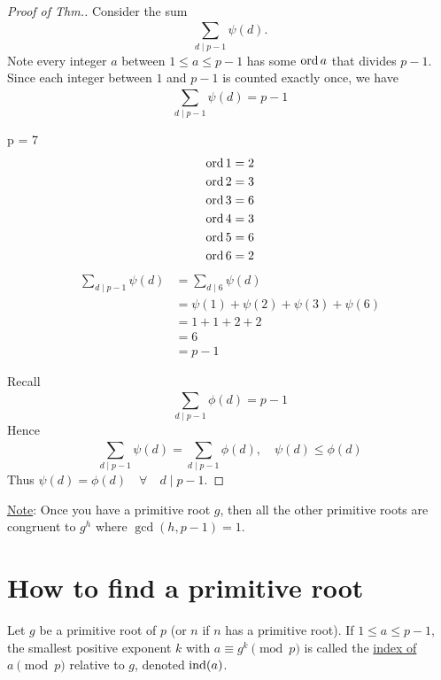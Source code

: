 \begin{theorem}
\begin{proof} [Proof of Thm.]
            Consider the sum
            \[ \sum_{d\mid p-1}^{}\psi(d). \]
            Note every integer $a$ between $1\le a\le p-1$ has some $\operatorname{ord}{a}$ 
            that divides $p-1$.
            Since each integer between $1$ and $p-1$ is counted exactly once,
            we have 
            \[ \sum_{d\mid p-1}^{} \psi(d) = p-1 \]
            \begin{mdframed}
            \begin{example}
                p = 7 
                \begin{align*}
                    \operatorname{ord}{1} &= 2 \\
                    \operatorname{ord}{2} &= 3 \\
                    \operatorname{ord}{3} &= 6 \\
                    \operatorname{ord}{4} &= 3 \\
                    \operatorname{ord}{5} &= 6 \\
                    \operatorname{ord}{6} &= 2
                \end{align*}
                \begin{align*}
                    \sum_{d\mid p-1}^{}\psi(d) &= \sum_{d\mid 6}^{} \psi(d) \\
                    &= \psi(1)+\psi(2)+\psi(3)+\psi(6) \\
                    &= 1+1+2+2 \\
                    &= 6 \\
                    &= p-1
                \end{align*}
            \end{example}
            \end{mdframed}

            Recall 
            \[ \sum_{d\mid p-1}^{}\phi(d) = p-1 \]
            Hence
            \[ \sum_{d\mid p-1}^{}\psi(d) = \sum_{d\mid p-1}^{}\phi(d), \quad\psi(d)\le \phi(d) \]  
            Thus $\psi(d) = \phi(d) \quad\forall\quad d\mid p-1$.
        \end{proof}
    \end{theorem}

    \underline{Note}: Once you have a primitive root $g$, then all the other primitive roots
    are congruent to $g^h$ where $\gcd(h,p-1) = 1$.

\section{How to find a primitive root}
    \begin{definition}
        Let $g$ be a primitive root of $p$ (or $n$ if $n$ has a primitive root).
        If $1\le a\le p-1$, the smallest positive exponent $k$ with $a\equiv g^k\pmod{p}$
        is called the \underline{index of $a\pmod{p}$} relative to $g$, 
        denoted $\operatorname{ind}(a)$.
    \end{definition}